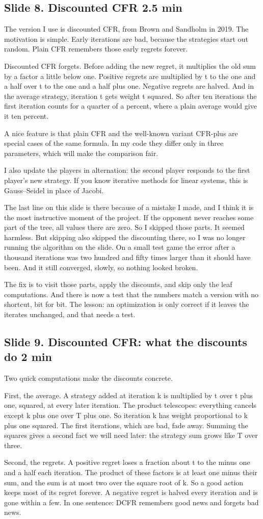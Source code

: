 \documentclass[11pt]{article}
\newcommand{\slidehead}[3]{\subsection*{Slide #1. #2 \hfill {\normalfont\small #3}}}
\begin{document}
\slidehead{8}{Discounted CFR}{2.5 min}
\begin{say}
The version I use is discounted CFR, from Brown and Sandholm in 2019. The motivation is simple. Early iterations
are bad, because the strategies start out random. Plain CFR remembers those early regrets forever.

Discounted CFR forgets. Before adding the new regret, it multiplies the old sum by a factor a little below one.
Positive regrets are multiplied by t to the one and a half over t to the one and a half plus one. Negative regrets
are halved. And in the average strategy, iteration t gets weight t squared. So after ten iterations the first
iteration counts for a quarter of a percent, where a plain average would give it ten percent.

A nice feature is that plain CFR and the well-known variant CFR-plus are special cases of the same formula. In my
code they differ only in three parameters, which will make the comparison fair.

I also update the players in alternation: the second player responds to the first player's new strategy. If you
know iterative methods for linear systems, this is Gauss--Seidel in place of Jacobi.

The last line on this slide is there because of a mistake I made, and I think it is the most instructive moment of
the project. If the opponent never reaches some part of the tree, all values there are zero. So I skipped those
parts. It seemed harmless. But skipping also skipped the discounting there, so I was no longer running the
algorithm on the slide. On a small test game the error after a thousand iterations was two hundred and fifty times
larger than it should have been. And it still converged, slowly, so nothing looked broken.

The fix is to visit those parts, apply the discounts, and skip only the leaf computations. And there is now a test
that the numbers match a version with no shortcut, bit for bit. The lesson: an optimization is only correct if it
leaves the iterates unchanged, and that needs a test.
\end{say}
\slidehead{9}{Discounted CFR: what the discounts do}{2 min}
\begin{say}
Two quick computations make the discounts concrete.

First, the average. A strategy added at iteration k is multiplied by t over t plus one, squared, at every later
iteration. The product telescopes: everything cancels except k plus one over T plus one. So iteration k has weight
proportional to k plus one squared. The first iterations, which are bad, fade away. Summing the squares gives a
second fact we will need later: the strategy sum grows like T over three.

Second, the regrets. A positive regret loses a fraction about t to the minus one and a half each iteration. The
product of these factors is at least one minus their sum, and the sum is at most two over the square root of k. So a
good action keeps most of its regret forever. A negative regret is halved every iteration and is gone within a few.
In one sentence: DCFR remembers good news and forgets bad news.
\end{say}
\end{document}

